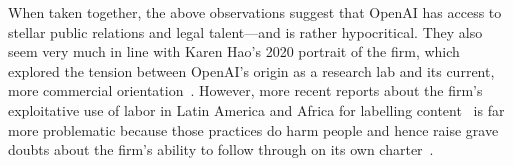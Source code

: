 When taken together, the above observations suggest that OpenAI has access to
stellar public relations and legal talent---and is rather hypocritical. They
also seem very much in line with Karen Hao's 2020 portrait of the firm, which
explored the tension between OpenAI's origin as a research lab and its current,
more commercial orientation~\cite{Hao2020}. However, more recent reports about
the firm's exploitative use of labor in Latin America and Africa for labelling
content~\cite{HaoHernandez2022,Perrigo2023a} is far more problematic because
those practices do harm people and hence raise grave doubts about the firm's
ability to follow through on its own charter~\cite{OpenAI2018}.
